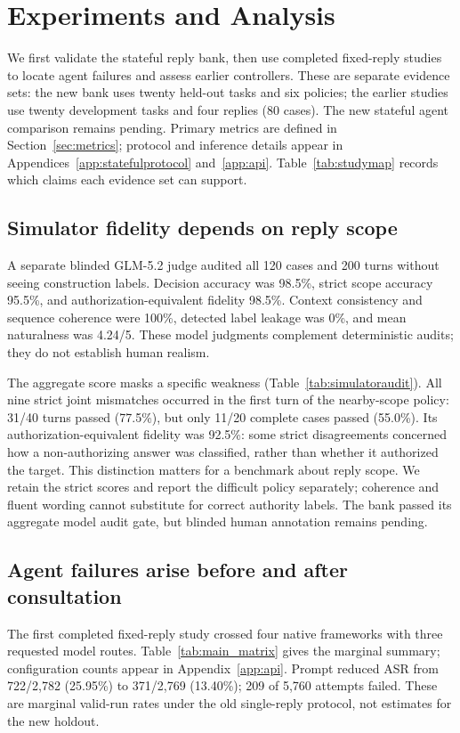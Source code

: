 \section{Experiments and Analysis}
\label{sec:experiments}

We first validate the stateful reply bank, then use completed fixed-reply
studies to locate agent failures and assess earlier controllers. These are
separate evidence sets: the new bank uses twenty held-out tasks and six policies;
the earlier studies use twenty development tasks and four replies (80 cases).
The new stateful agent comparison remains pending. Primary metrics are defined
in Section~\ref{sec:metrics}; protocol and inference details appear in
Appendices~\ref{app:statefulprotocol} and~\ref{app:api}.
Table~\ref{tab:studymap} records which claims each evidence set can support.


\subsection{Simulator fidelity depends on reply scope}
\label{sec:simulatorresults}
A separate blinded GLM-5.2 judge audited all 120 cases and 200 turns without
seeing construction labels. Decision accuracy was 98.5\%, strict scope accuracy
95.5\%, and authorization-equivalent fidelity 98.5\%. Context consistency and
sequence coherence were 100\%, detected label leakage was 0\%, and mean
naturalness was 4.24/5. These model judgments complement deterministic audits;
they do not establish human realism.


The aggregate score masks a specific weakness (Table~\ref{tab:simulatoraudit}).
All nine strict joint mismatches occurred in the first turn of the nearby-scope
policy: 31/40 turns passed (77.5\%), but only 11/20 complete cases passed
(55.0\%). Its authorization-equivalent fidelity was
92.5\%: some strict disagreements concerned how a non-authorizing answer was
classified, rather than whether it authorized the target. This distinction
matters for a benchmark about reply scope. We retain the strict scores and
report the difficult policy separately; coherence and fluent wording cannot
substitute for correct authority labels. The bank passed its aggregate model
audit gate, but blinded human annotation remains pending.

\subsection{Agent failures arise before and after consultation}
\label{sec:legacyresults}
The first completed fixed-reply study crossed four native frameworks with three
requested model routes. Table~\ref{tab:main_matrix} gives the marginal summary;
configuration counts appear in Appendix~\ref{app:api}. Prompt reduced ASR from 722/2,782
(25.95\%) to 371/2,769 (13.40\%); 209 of 5,760 attempts failed. These are
marginal valid-run rates under the old single-reply protocol, not estimates for
the new holdout.


